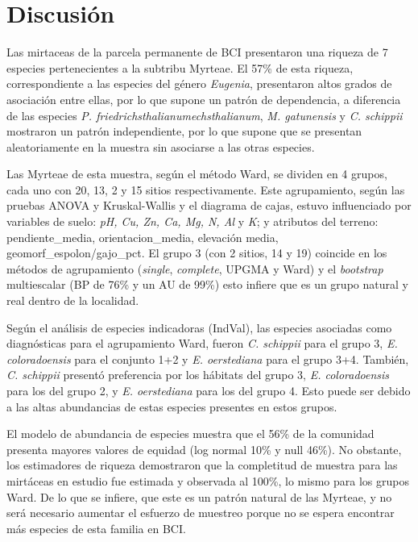 \documentclass[11pt,]{article}
\begin{document}
\section{Discusión}\label{discusiuxf3n}

Las mirtaceas de la parcela permanente de BCI presentaron una riqueza de
7 especies pertenecientes a la subtribu Myrteae. El 57\% de esta
riqueza, correspondiente a las especies del género \emph{Eugenia},
presentaron altos grados de asociación entre ellas, por lo que supone un
patrón de dependencia, a diferencia de las especies \emph{P.
friedrichsthalianumechsthalianum}, \emph{M. gatunensis} y \emph{C.
schippii} mostraron un patrón independiente, por lo que supone que se
presentan aleatoriamente en la muestra sin asociarse a las otras
especies.

Las Myrteae de esta muestra, según el método Ward, se dividen en 4
grupos, cada uno con 20, 13, 2 y 15 sitios respectivamente. Este
agrupamiento, según las pruebas ANOVA y Kruskal-Wallis y el diagrama de
cajas, estuvo influenciado por variables de suelo: \emph{pH, Cu, Zn, Ca,
Mg, N, Al} y \emph{K}; y atributos del terreno: pendiente\_media,
orientacion\_media, elevación media, geomorf\_espolon/gajo\_pct. El
grupo 3 (con 2 sitios, 14 y 19) coincide en los métodos de agrupamiento
(\emph{single}, \emph{complete}, UPGMA y Ward) y el \emph{bootstrap}
multiescalar (BP de 76\% y un AU de 99\%) esto infiere que es un grupo
natural y real dentro de la localidad.

Según el análisis de especies indicadoras (IndVal), las especies
asociadas como diagnósticas para el agrupamiento Ward, fueron \emph{C.
schippii} para el grupo 3, \emph{E. coloradoensis} para el conjunto 1+2
y \emph{E. oerstediana} para el grupo 3+4. También, \emph{C. schippii}
presentó preferencia por los hábitats del grupo 3, \emph{E.
coloradoensis} para los del grupo 2, y \emph{E. oerstediana} para los
del grupo 4. Esto puede ser debido a las altas abundancias de estas
especies presentes en estos grupos.

El modelo de abundancia de especies muestra que el 56\% de la comunidad
presenta mayores valores de equidad (log normal 10\% y null 46\%). No
obstante, los estimadores de riqueza demostraron que la completitud de
muestra para las mirtáceas en estudio fue estimada y observada al 100\%,
lo mismo para los grupos Ward. De lo que se infiere, que este es un
patrón natural de las Myrteae, y no será necesario aumentar el esfuerzo
de muestreo porque no se espera encontrar más especies de esta familia
en BCI.
\end{document}
